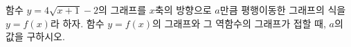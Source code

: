 함수 $y=4\sqrt{x+1}-2$의 그래프를 $x$축의 방향으로 $a$만큼 평행이동한 그래프의 식을 $y=f(x)$라 하자. 함수 $y=f(x)$의 그래프와 그 역함수의 그래프가 접할 때, $a$의 값을 구하시오.
